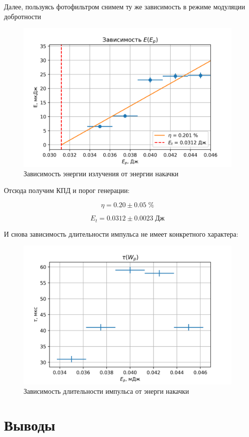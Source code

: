 \documentclass[a4paper]{article}
\begin{document}
Далее, пользуясь фотофильтром снимем ту же зависимость в режиме модуляции добротности

\begin{figure}[h]
\centering
\includegraphics[width=0.65\linewidth]{linear_W2.png}
\caption{Зависимость энергии излучения от энергии накачки}
\label{fig:graph}
\end{figure}

Отсюда получим КПД и порог генерации: 

\begin{equation*}
	\eta = 0.20 \pm 0.05 \; \%
\end{equation*}

\begin{equation*}
	E_t = 0.0312 \pm 0.0023 \; \text{Дж}
\end{equation*}

И снова зависимость длительности импульса не имеет конкретного характера:

\begin{figure}[h]
\centering
\includegraphics[width=0.65\linewidth]{linear_width2.png}
\caption{Зависимость длительности импульса от энерги накачки}
\label{fig:graph}
\end{figure}


\newpage
\section{Выводы}
\end{document}
